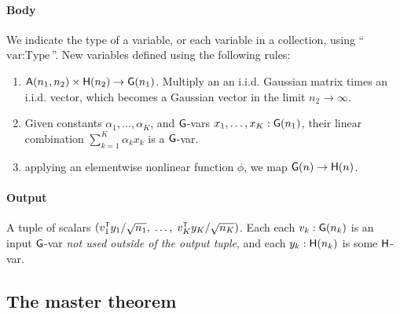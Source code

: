 {\paragraph{Body} We indicate the type of a variable, or each variable in a
collection, using ``$\text{var} : \text{Type}$''.
New variables defined using the following rules:
\begin{enumerate}
  \item[\MatMul] $\mathsf{A}(n_1, n_2) \times \mathsf{H}(n_2) \to \mathsf{G}(n_1)$. Multiply an
    an i.i.d. Gaussian matrix times an i.i.d. vector, which becomes a Gaussian
    vector in the limit $n_2 \to \infty$.
  \item[\LinComb] Given constants $\alpha_1,\dots,\alpha_K$, and $\mathsf{G}$-vars
    $x_1,\dots,x_K : \mathsf{G}(n_1)$, their linear combination $\sum_{k=1}^K \alpha_k
    x_k$ is a $\mathsf{G}$-var.
  \item[\NonLin] applying an elementwise nonlinear function $\phi$, we map
    $\mathsf{G}(n) \to \mathsf{H}(n)$.
\end{enumerate}

\paragraph{Output} A tuple of scalars $(v_1^\tp y_1/\sqrt{n_1}, \;\dots, \; v_K^\tp
y_K/\sqrt{n_K})$. Each each $v_k : \mathsf{G}(n_k)$ is an input $\mathsf{G}$-var \emph{not
used outside of the output tuple}, and each $y_k : \mathsf{H}(n_k)$ is some
$\mathsf{H}$-var.

\subsection{The \Netsor master theorem}
\begin{definition}

\end{definition}




}  %




